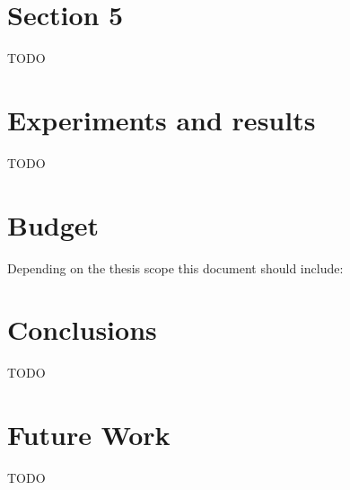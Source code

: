 \documentclass[a4paper,12pt]{article}
\begin{document}
\newpage
\section{Section 5}
\label{sec:sect5}
TODO

\clearpage
\section{Experiments and results}
\label{sec:tests}
TODO

\clearpage
\section{Budget}

{Depending on the thesis scope this document should include:}

%

\clearpage
\section{Conclusions}
\label{sec:conclusions}

TODO

\section{Future Work}
\label{sec:futwork}

TODO

\newpage

\medskip




%
%

\cleardoublepage
{}
\printacronyms[include=abbrev,name=Glossary]
\end{document}
